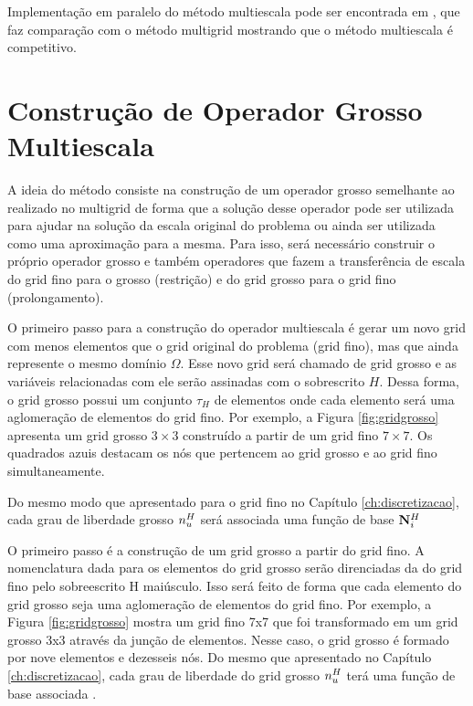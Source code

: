 Implementação em paralelo do método multiescala pode ser encontrada em \citet{msparalelo}, que faz comparação com o método multigrid mostrando que o método multiescala é competitivo.

\section{Construção de Operador Grosso Multiescala}

A ideia do método consiste na construção de um operador grosso semelhante ao realizado no multigrid de forma que a solução desse operador pode ser utilizada para ajudar na solução da escala original do problema ou ainda ser utilizada como uma aproximação para a mesma. Para isso, será necessário construir o próprio operador grosso e também operadores que fazem a transferência de escala do grid fino para o grosso (restrição) e do grid grosso para o grid fino (prolongamento).


O primeiro passo para a construção do operador multiescala é gerar um novo grid com menos elementos que o grid original do problema (grid fino), mas que ainda represente o mesmo domínio $\Omega$. Esse novo grid será chamado de grid grosso e as variáveis relacionadas com ele serão assinadas com o sobrescrito $H$.
Dessa forma, o grid grosso possui um conjunto $\tau_H$ de elementos onde cada elemento será uma aglomeração de elementos do grid fino. Por exemplo, a Figura \ref{fig:gridgrosso} apresenta um grid grosso $3\times 3$ construído a partir de um grid fino $7\times 7$.  Os quadrados azuis destacam os nós que pertencem ao grid grosso e ao grid fino simultaneamente.


Do mesmo modo que apresentado para o grid fino no Capítulo \ref{ch:discretizacao}, cada grau de liberdade grosso $n_u^H$ será associada uma função de base ${\mathbf{N}_{i}^H}$




O primeiro passo é a construção de um grid grosso a partir do grid fino. A nomenclatura dada para os elementos do grid grosso serão direnciadas da do grid fino pelo sobreescrito H maiúsculo. Isso será feito de forma que cada elemento do grid grosso seja uma aglomeração de elementos do grid fino. Por exemplo, a Figura \ref{fig:gridgrosso} mostra um grid fino 7x7 que foi transformado em um grid grosso 3x3 através da junção de elementos. Nesse caso, o grid grosso é formado por nove elementos e dezesseis nós. Do mesmo que apresentado no Capítulo \ref{ch:discretizacao}, cada grau de liberdade do grid grosso $n_u^H$ terá uma função de base associada .

